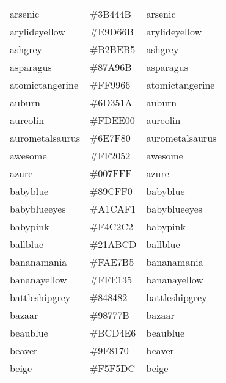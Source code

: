 \documentclass[
]{article}
\begin{document}
\begin{longtable}[]{@{}lll@{}}
arsenic & \colorbox[rgb]{0.23,0.27,0.29}{\#3B444B} &
\textcolor[rgb]{0.23,0.27,0.29}{arsenic               }\tabularnewline
arylideyellow & \colorbox[rgb]{0.91,0.84,0.42}{\#E9D66B} &
\textcolor[rgb]{0.91,0.84,0.42}{arylideyellow         }\tabularnewline
ashgrey & \colorbox[rgb]{0.7,0.75,0.71}{\#B2BEB5} &
\textcolor[rgb]{0.7,0.75,0.71}{ashgrey               }\tabularnewline
asparagus & \colorbox[rgb]{0.53,0.66,0.42}{\#87A96B} &
\textcolor[rgb]{0.53,0.66,0.42}{asparagus             }\tabularnewline
atomictangerine & \colorbox[rgb]{1.0,0.6,0.4}{\#FF9966} &
\textcolor[rgb]{1.0,0.6,0.4}{atomictangerine       }\tabularnewline
auburn & \colorbox[rgb]{0.43,0.21,0.1}{\#6D351A} &
\textcolor[rgb]{0.43,0.21,0.1}{auburn                }\tabularnewline
aureolin & \colorbox[rgb]{0.99,0.93,0.0}{\#FDEE00} &
\textcolor[rgb]{0.99,0.93,0.0}{aureolin              }\tabularnewline
aurometalsaurus & \colorbox[rgb]{0.43,0.5,0.5}{\#6E7F80} &
\textcolor[rgb]{0.43,0.5,0.5}{aurometalsaurus       }\tabularnewline
awesome & \colorbox[rgb]{1.0,0.13,0.32}{\#FF2052} &
\textcolor[rgb]{1.0,0.13,0.32}{awesome               }\tabularnewline
azure & \colorbox[rgb]{0.0,0.5,1.0}{\#007FFF} &
\textcolor[rgb]{0.0,0.5,1.0}{azure                 }\tabularnewline
babyblue & \colorbox[rgb]{0.54,0.81,0.94}{\#89CFF0} &
\textcolor[rgb]{0.54,0.81,0.94}{babyblue              }\tabularnewline
babyblueeyes & \colorbox[rgb]{0.63,0.79,0.95}{\#A1CAF1} &
\textcolor[rgb]{0.63,0.79,0.95}{babyblueeyes          }\tabularnewline
babypink & \colorbox[rgb]{0.96,0.76,0.76}{\#F4C2C2} &
\textcolor[rgb]{0.96,0.76,0.76}{babypink              }\tabularnewline
ballblue & \colorbox[rgb]{0.13,0.67,0.8}{\#21ABCD} &
\textcolor[rgb]{0.13,0.67,0.8}{ballblue              }\tabularnewline
bananamania & \colorbox[rgb]{0.98,0.91,0.71}{\#FAE7B5} &
\textcolor[rgb]{0.98,0.91,0.71}{bananamania           }\tabularnewline
bananayellow & \colorbox[rgb]{1.0,0.88,0.21}{\#FFE135} &
\textcolor[rgb]{1.0,0.88,0.21}{bananayellow          }\tabularnewline
battleshipgrey & \colorbox[rgb]{0.52,0.52,0.51}{\#848482} &
\textcolor[rgb]{0.52,0.52,0.51}{battleshipgrey        }\tabularnewline
bazaar & \colorbox[rgb]{0.6,0.47,0.48}{\#98777B} &
\textcolor[rgb]{0.6,0.47,0.48}{bazaar                }\tabularnewline
beaublue & \colorbox[rgb]{0.74,0.83,0.9}{\#BCD4E6} &
\textcolor[rgb]{0.74,0.83,0.9}{beaublue              }\tabularnewline
beaver & \colorbox[rgb]{0.62,0.51,0.44}{\#9F8170} &
\textcolor[rgb]{0.62,0.51,0.44}{beaver                }\tabularnewline
beige & \colorbox[rgb]{0.96,0.96,0.86}{\#F5F5DC} &
\textcolor[rgb]{0.96,0.96,0.86}{beige                 }\tabularnewline

\end{longtable}
\end{document}
